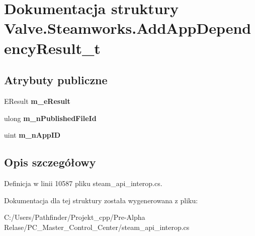 \hypertarget{struct_valve_1_1_steamworks_1_1_add_app_dependency_result__t}{}\section{Dokumentacja struktury Valve.\+Steamworks.\+Add\+App\+Dependency\+Result\+\_\+t}
\label{struct_valve_1_1_steamworks_1_1_add_app_dependency_result__t}
\subsection*{Atrybuty publiczne}
\begin{DoxyCompactItemize}
\item 
\mbox{\label{struct_valve_1_1_steamworks_1_1_add_app_dependency_result__t_a75bc7305f2352f5ab9a426b145d5708e}} 
E\+Result {\bfseries m\+\_\+e\+Result}
\item 
\mbox{\label{struct_valve_1_1_steamworks_1_1_add_app_dependency_result__t_a3963494772fb157195f8e3526a67a920}} 
ulong {\bfseries m\+\_\+n\+Published\+File\+Id}
\item 
\mbox{\label{struct_valve_1_1_steamworks_1_1_add_app_dependency_result__t_a6ba2f1ebbeabdd306e3f2fcaf45b6dbe}} 
uint {\bfseries m\+\_\+n\+App\+ID}
\end{DoxyCompactItemize}


\subsection{Opis szczegółowy}


Definicja w linii 10587 pliku steam\+\_\+api\+\_\+interop.\+cs.



Dokumentacja dla tej struktury została wygenerowana z pliku\+:\begin{DoxyCompactItemize}
\item 
C\+:/\+Users/\+Pathfinder/\+Projekt\+\_\+cpp/\+Pre-\/\+Alpha Relase/\+P\+C\+\_\+\+Master\+\_\+\+Control\+\_\+\+Center/steam\+\_\+api\+\_\+interop.\+cs\end{DoxyCompactItemize}
